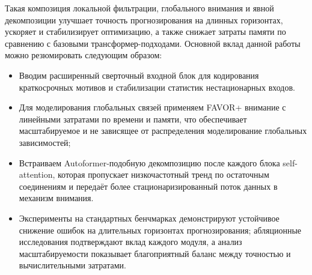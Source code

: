 Такая композиция локальной фильтрации, глобального внимания и явной
декомпозиции улучшает точность прогнозирования на длинных горизонтах,
ускоряет и стабилизирует оптимизацию, а также снижает затраты памяти по
сравнению с базовыми трансформер-подходами. Основной вклад данной работы можно 
резюмировать следующим образом:
\begin{itemize}
    \item Вводим расширенный сверточный входной блок для кодирования краткосрочных
    мотивов и стабилизации статистик нестационарных входов.  

    \item Для моделирования глобальных связей применяем FAVOR+ внимание с линейными затратами 
    по времени и памяти, что обеспечивает 
    масштабируемое и не зависящее от распределения моделирование глобальных зависимостей;  

    \item Встраиваем Autoformer-подобную\cite{autoformer} декомпозицию после каждого блока 
    self-attention, которая пропускает низкочастотный тренд по остаточным соединениям и 
    передаёт более стационаризированный поток данных в механизм внимания.

    \item Эксперименты на стандартных бенчмарках
    демонстрируют устойчивое снижение ошибок на длительных горизонтах
    прогнозирования; абляционные исследования подтверждают вклад каждого модуля,
    а анализ масштабируемости показывает благоприятный баланс между точностью и
    вычислительными затратами.
\end{itemize}
